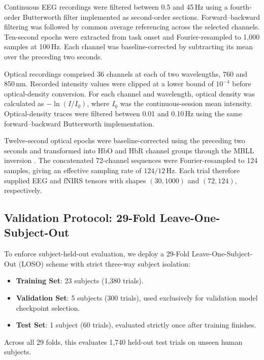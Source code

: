 \documentclass[final,5p,times,twocolumn]{elsarticle}
\begin{document}
Continuous EEG recordings were filtered between 0.5 and 45\,Hz using a fourth-order Butterworth filter implemented as second-order sections. Forward--backward filtering was followed by common average referencing across the selected channels. Ten-second epochs were extracted from task onset and Fourier-resampled to 1,000 samples at 100\,Hz. Each channel was baseline-corrected by subtracting its mean over the preceding two seconds.

Optical recordings comprised 36 channels at each of two wavelengths, 760 and 850\,nm. Recorded intensity values were clipped at a lower bound of $10^{-4}$ before optical-density conversion. For each channel and wavelength, optical density was calculated as $-\ln(I/I_0)$, where $I_0$ was the continuous-session mean intensity. Optical-density traces were filtered between 0.01 and 0.10\,Hz using the same forward--backward Butterworth implementation.

Twelve-second optical epochs were baseline-corrected using the preceding two seconds and transformed into HbO and HbR channel groups through the MBLL inversion \cite{delpy1988estimation}. The concatenated 72-channel sequences were Fourier-resampled to 124 samples, giving an effective sampling rate of $124/12$\,Hz. Each trial therefore supplied EEG and fNIRS tensors with shapes $(30,1000)$ and $(72,124)$, respectively.

\subsection{Validation Protocol: 29-Fold Leave-One-Subject-Out}
To enforce subject-held-out evaluation, we deploy a 29-Fold Leave-One-Subject-Out (LOSO) scheme with strict three-way subject isolation:
\begin{itemize}
    \item \textbf{Training Set}: 23 subjects (1,380 trials).
    \item \textbf{Validation Set}: 5 subjects (300 trials), used exclusively for validation model checkpoint selection.
    \item \textbf{Test Set}: 1 subject (60 trials), evaluated strictly once after training finishes.
\end{itemize}
Across all 29 folds, this evaluates 1,740 held-out test trials on unseen human subjects.
\end{document}
